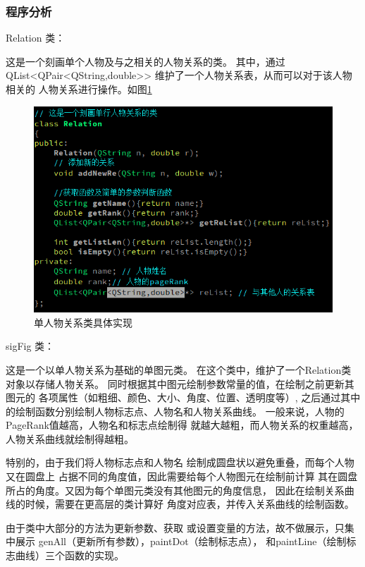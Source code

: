 \documentclass[a4paper,UTF8]{article}
\numberwithin{equation}{section}
\begin{document}
\subsubsection{程序分析}
Relation 类：
\par 这是一个刻画单个人物及与之相关的人物关系的类。
其中，通过QList<QPair<QString,double>>
维护了一个人物关系表，从而可以对于该人物相关的
人物关系进行操作。如图\ref{task6-Relation}
\begin{figure}[htbp]
    \centering
    \includegraphics[width = 15cm]{task6-Relation.png}
    \caption{单人物关系类具体实现}
    \label{task6-Relation}
\end{figure}

\par sigFig 类：
\par 这是一个以单人物关系为基础的单图元类。
在这个类中，维护了一个Relation类对象以存储人物关系。
同时根据其中图元绘制参数常量的值，在绘制之前更新其图元的
各项属性（如粗细、颜色、大小、角度、位置、透明度等）,
之后通过其中的绘制函数分别绘制人物标志点、人物名和人物关系曲线。
一般来说，人物的PageRank值越高，人物名和标志点绘制得
就越大越粗，而人物关系的权重越高，人物关系曲线就绘制得越粗。
\par 特别的，由于我们将人物标志点和人物名
绘制成圆盘状以避免重叠，而每个人物又在圆盘上
占据不同的角度值，因此需要给每个人物图元在绘制前计算
其在圆盘所占的角度。又因为每个单图元类没有其他图元的角度信息，
因此在绘制关系曲线的时候，需要在更高层的类计算好
角度对应表，并传入关系曲线的绘制函数。

\par 由于类中大部分的方法为更新参数、获取
或设置变量的方法，故不做展示，只集中展示
genAll（更新所有参数），paintDot（绘制标志点），
和paintLine（绘制标志曲线）三个函数的实现。
\end{document}
